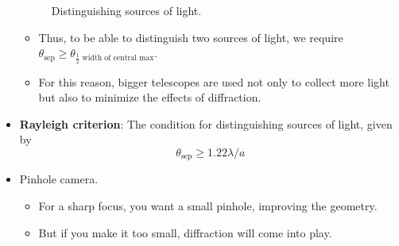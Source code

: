 \documentclass[../notes.tex]{subfiles}
\begin{document}
\begin{itemize}
\begin{figure}[h!]
        \caption{Distinguishing sources of light.}
        \label{fig:lightRetina}
    \end{figure}
    \begin{itemize}
        \item Thus, to be able to distinguish two sources of light, we require $\theta_\text{sep}\geq\theta_\text{$\frac{1}{2}$ width of central max}$.
        \item For this reason, bigger telescopes are used not only to collect more light but also to minimize the effects of diffraction.
    \end{itemize}
    \item \textbf{Rayleigh criterion}: The condition for distinguishing sources of light, given by
    \begin{equation*}
        \theta_\text{sep} \geq 1.22\lambda/a
    \end{equation*}
    \item Pinhole camera.
    \begin{itemize}
        \item For a sharp focus, you want a small pinhole, improving the geometry.
        \item But if you make it too small, diffraction will come into play.
    \end{itemize}
\end{itemize}
\end{document}
